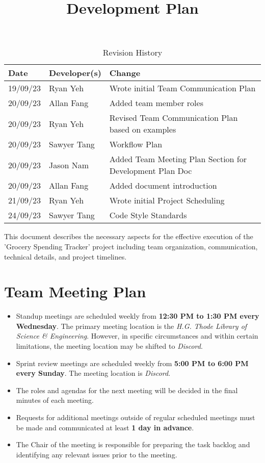 \documentclass{article}
\title{Development Plan\\\progname}
\author{\authname}
\date{}
\begin{document}
\maketitle

\begin{table}[hp]
\caption{Revision History} \label{TblRevisionHistory}
\begin{tabularx}{\textwidth}{llX}
\toprule
\textbf{Date} & \textbf{Developer(s)} & \textbf{Change}\\
\midrule
19/09/23 & Ryan Yeh & Wrote initial Team Communication Plan\\
20/09/23 & Allan Fang & Added team member roles\\
20/09/23 & Ryan Yeh & Revised Team Communication Plan based on examples\\
20/09/23 & Sawyer Tang & Workflow Plan\\
20/09/23 & Jason Nam & Added Team Meeting Plan Section for Development Plan Doc\\
20/09/23 & Allan Fang & Added document introduction\\
21/09/23 & Ryan Yeh & Wrote initial Project Scheduling\\
24/09/23 & Sawyer Tang & Code Style Standards\\
\bottomrule
\end{tabularx}
\end{table}

This document describes the necessary aspects for the effective execution of the 'Grocery Spending Tracker' project including team organization, communication, technical details, and project timelines.

\section{Team Meeting Plan}

\begin{itemize}
	\item Standup meetings are scheduled weekly from \textbf{12:30 PM to 1:30 PM every Wednesday}. The primary meeting location is the \emph{H.G. Thode Library of Science \& Engineering}. However, in specific circumstances and within certain limitations, the meeting location may be shifted to \emph{Discord}.
    	\item Sprint review meetings are scheduled weekly from \textbf{5:00 PM to 6:00 PM every Sunday}. The meeting location is \emph{Discord}.
    	\item The roles and agendas for the next meeting will be decided in the final minutes of each meeting.
    	\item Requests for additional meetings outside of regular scheduled meetings must be made and communicated at least \textbf{1 day in advance}.
   	\item The Chair of the meeting is responsible for preparing the task backlog and identifying any relevant issues prior to the meeting.
\end{itemize}
\end{document}
